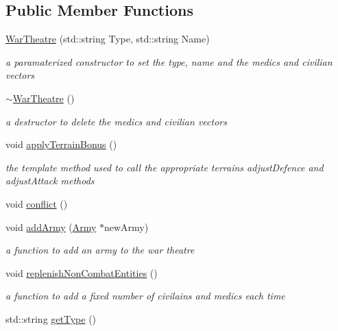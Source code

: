 \subsection*{Public Member Functions}
\begin{DoxyCompactItemize}
\item 
\mbox{\hyperlink{class_war_theatre_ac1dc683301091ecc993f5f8c43a076ec}{War\+Theatre}} (std\+::string Type, std\+::string Name)
\begin{DoxyCompactList}\small\item\em a paramaterized constructor to set the type, name and the medics and civilian vectors \end{DoxyCompactList}\item 
\mbox{\hyperlink{class_war_theatre_a28324e2234a88933e1697c0f7f9ff222}{$\sim$\+War\+Theatre}} ()
\begin{DoxyCompactList}\small\item\em a destructor to delete the medics and civilian vectors \end{DoxyCompactList}\item 
void \mbox{\hyperlink{class_war_theatre_a506466397ba9769d7128ea41a649af9e}{apply\+Terrain\+Bonus}} ()
\begin{DoxyCompactList}\small\item\em the template method used to call the appropriate terrain\textquotesingle{}s adjust\+Defence and adjust\+Attack methods \end{DoxyCompactList}\item 
void \mbox{\hyperlink{class_war_theatre_a387bd59d6d1cd476764d2e6bfe8dd8df}{conflict}} ()
\item 
void \mbox{\hyperlink{class_war_theatre_ab51f972cc9b47859149f9132bcbcbaf5}{add\+Army}} (\mbox{\hyperlink{class_army}{Army}} $\ast$new\+Army)
\begin{DoxyCompactList}\small\item\em a function to add an army to the war theatre \end{DoxyCompactList}\item 
void \mbox{\hyperlink{class_war_theatre_a776ea7d7c2cc732d7eb0f0298e4cde8b}{replenish\+Non\+Combat\+Entities}} ()
\begin{DoxyCompactList}\small\item\em a function to add a fixed number of civilains and medics each time \end{DoxyCompactList}\item 
std\+::string \mbox{\hyperlink{class_war_theatre_a5833b9da41252b8339f0b2cf1873648f}{get\+Type}} ()

\end{DoxyCompactItemize}

